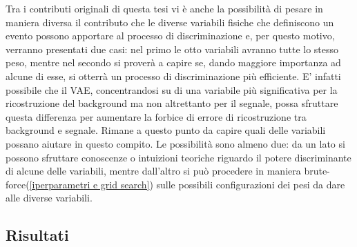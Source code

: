 Tra i contributi originali di questa tesi vi è anche la possibilità di pesare in maniera diversa il contributo che le diverse variabili fisiche che definiscono un evento possono apportare al processo di discriminazione e, per questo motivo, verranno presentati due casi: nel primo le otto variabili avranno tutte lo stesso peso, mentre nel secondo si proverà a capire se, dando maggiore importanza ad alcune di esse, si otterrà un processo di discriminazione più efficiente. E' infatti possibile che il VAE, concentrandosi su di una variabile più significativa per la ricostruzione del background ma non altrettanto per il segnale, possa sfruttare questa differenza per aumentare la forbice di errore di ricostruzione tra background e segnale. Rimane a questo punto da capire quali delle variabili possano aiutare in questo compito. Le possibilità sono almeno due: da un lato si possono sfruttare conoscenze o intuizioni teoriche riguardo il potere discriminante di alcune delle variabili, mentre dall'altro si può procedere in maniera brute-force(\ref{iperparametri e grid search}) sulle possibili configurazioni dei pesi da dare alle diverse variabili.\\


\newpage


\subsection{Risultati}
\label{risultati}

